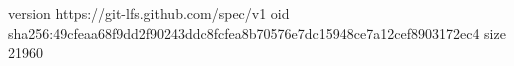 version https://git-lfs.github.com/spec/v1
oid sha256:49cfeaa68f9dd2f90243ddc8fcfea8b70576e7dc15948ce7a12cef8903172ec4
size 21960
